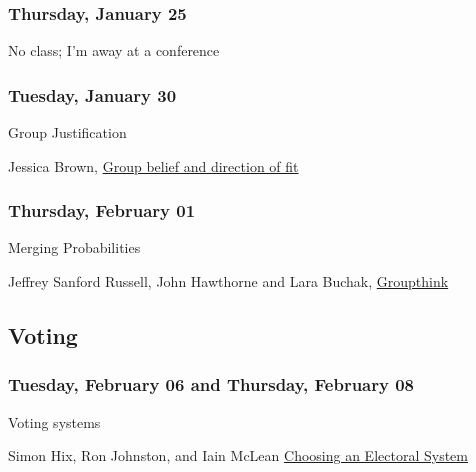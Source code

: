 \documentclass[
  12pt,
  letterpaper,
  DIV=11,
  numbers=noendperiod]{scrartcl}
\providecommand{\tightlist}{%
  \setlength{\itemsep}{0pt}\setlength{\parskip}{0pt}}\usepackage{longtable,booktabs,array}
\begin{document}
\subsubsection{Thursday, January 25}\label{thursday-january-25}

No class; I'm away at a conference

\subsubsection{Tuesday, January 30}\label{tuesday-january-30}

\begin{description}
\tightlist
\item[Topic]
Group Justification
\item[Reading]
Jessica Brown, \href{https://philpapers.org/rec/BROGBA-3}{Group belief
and direction of fit}
\end{description}

\subsubsection{Thursday, February 01}\label{thursday-february-01}

\begin{description}
\tightlist
\item[Topic]
Merging Probabilities
\item[Reading]
Jeffrey Sanford Russell, John Hawthorne and Lara Buchak,
\href{https://philpapers.org/rec/RUSG}{Groupthink}
\end{description}

\subsection{Voting}\label{voting}

\subsubsection{Tuesday, February 06 and Thursday, February
08}\label{tuesday-february-06-and-thursday-february-08}

\begin{description}
\tightlist
\item[Topic]
Voting systems
\item[Reading]
Simon Hix, Ron Johnston, and Iain McLean
\href{https://www.thebritishacademy.ac.uk/publications/choosing-electoral-system/}{Choosing
an Electoral System}
\end{description}
\end{document}
